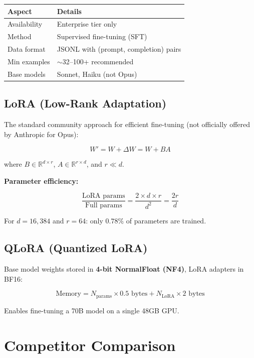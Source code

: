 \documentclass[11pt,a4paper]{article}
\begin{document}
\begin{center}
\begin{tabular}{ll}
\toprule
\textbf{Aspect} & \textbf{Details} \\
\midrule
Availability & Enterprise tier only \\
Method & Supervised fine-tuning (SFT) \\
Data format & JSONL with (prompt, completion) pairs \\
Min examples & $\sim$32--100+ recommended \\
Base models & Sonnet, Haiku (not Opus) \\
\bottomrule
\end{tabular}
\end{center}

\subsection{LoRA (Low-Rank Adaptation)}

The standard community approach for efficient fine-tuning (not officially offered by Anthropic for Opus):

$$W' = W + \Delta W = W + BA$$

where $B \in \mathbb{R}^{d \times r}$, $A \in \mathbb{R}^{r \times d}$, and $r \ll d$.

\textbf{Parameter efficiency:}

$$\frac{\text{LoRA params}}{\text{Full params}} = \frac{2 \times d \times r}{d^2} = \frac{2r}{d}$$

For $d = 16{,}384$ and $r = 64$: only $0.78\%$ of parameters are trained.

\subsection{QLoRA (Quantized LoRA)}

Base model weights stored in \textbf{4-bit NormalFloat (NF4)}, LoRA adapters in BF16:

$$\text{Memory} = N_{\text{params}} \times 0.5\text{ bytes} + N_{\text{LoRA}} \times 2\text{ bytes}$$

Enables fine-tuning a 70B model on a single 48GB GPU.

\section{Competitor Comparison}
\end{document}
